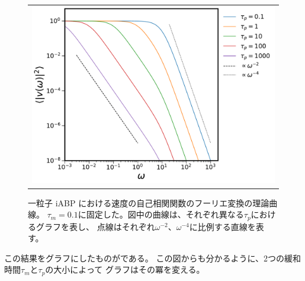 \documentclass[/Users/ikedahajime/GitHub/reserch/master_report/thesis]{subfiles}
\begin{document}
\begin{figure}
    \centering
    \begin{tabular}{c}
        \begin{minipage}{0.7\hsize}
            \includegraphics[width=\textwidth]{img/method/ft_vcor.pdf}
        \end{minipage}
    \end{tabular}
    \caption[Four sample images]
    {
        一粒子 iABP における速度の自己相関関数のフーリエ変換の理論曲線。
        $\tau_{m}=0.1$に固定した。図中の曲線は、それぞれ異なる$\tau_p$におけるグラフを表し、
        点線はそれぞれ$\omega^{-2}、\omega^{-4}$に比例する直線を表す。
    }%
    \label{fig:method_ft_single}
\end{figure}


この結果をグラフにしたものがである。
この図からも分かるように、2つの緩和時間$\tau_m$と$\tau_p$の大小によって
グラフはその冪を変える。
\end{document}
